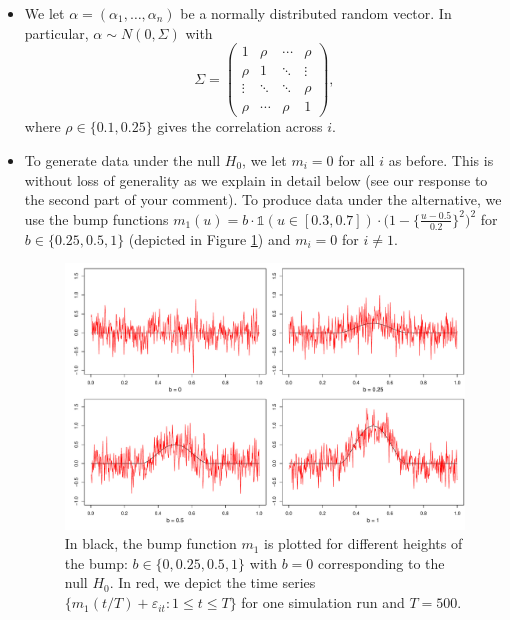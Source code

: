 \documentclass[a4paper,12pt]{article}
\begin{document}
\begin{enumerate}[label=\arabic*.,leftmargin=0.6cm]
\begin{enumerate}[label=(\roman*),leftmargin=0.75cm,topsep=0pt]
\begin{itemize}[leftmargin=0.45cm,itemsep=0pt,topsep=0pt]
\item We let $\alpha = (\alpha_1,\ldots,\alpha_n)$ be a normally distributed random vector. In particular, $\alpha \sim N(0,\Sigma)$ with
\[ \Sigma =
\begin{pmatrix}
1      & \rho   & \cdots & \rho   \\
\rho   & 1      & \ddots & \vdots \\
\vdots & \ddots & \ddots & \rho   \\
\rho   & \cdots & \rho   & 1
\end{pmatrix},
\]
where $\rho \in \{0.1, 0.25\}$ gives the correlation across $i$.

\item To generate data under the null $H_0$, we let $m_i = 0$ for all $i$ as before. This is without loss of generality as we explain in detail below (see our response to the second part of your comment). To produce data under the alternative, we use the bump functions $m_1(u) = b \cdot \mathbb{1}(u \in [0.3, 0.7]) \cdot \big(1 - \big\{\frac{u - 0.5}{0.2}\big\}^2\big)^2$ for $b \in \{ 0.25, 0.5, 1 \}$ (depicted in Figure \ref{fig:bump_function}) and $m_i = 0$ for $i \neq 1$.

\begin{figure}[t!]
\includegraphics[width=\textwidth]{output/bump_function.pdf}
\caption{In black, the bump function $m_1$ is plotted for different heights of the bump: $b \in \{0, 0.25, 0.5, 1\}$ with $b=0$ corresponding to the null $H_0$. In red, we depict the time series $\{m_1(t/T) + \varepsilon_{it}: 1 \le t \le T\}$ for one simulation run and $T=500$.}\label{fig:bump_function}

\end{figure}


\end{itemize}
\end{enumerate}
\end{enumerate}
\end{document}
